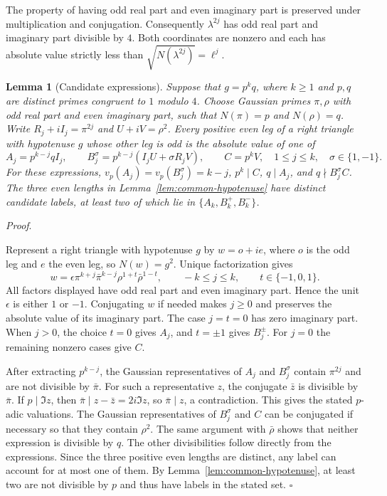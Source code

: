 \documentclass[11pt,a4paper,twoside]{article}
\numberwithin{equation}{section}
\newcommand{\proseheadingstop}{.}
\newtheorem{lemma}[theorem]{Lemma}
\providecommand{\proofname}{Proof}
\newenvironment{proof}[1][\proofname]{%
  \par\addvspace{.65\baselineskip}\noindent
  \textit{#1}\proseheadingstop\enspace\ignorespaces
}{%
  \unskip\nobreak\hfill\nobreak\(\square\)\par
  \addvspace{.65\baselineskip}
}
\begin{document}
The property of having odd real part and even imaginary part is preserved under multiplication and conjugation. Consequently \(\lambda^{2j}\) has odd real part and imaginary part divisible by \(4\). Both coordinates are nonzero and each has absolute value strictly less than \(\sqrt{N(\lambda^{2j})}=\ell^j\).

\begin{lemma}[Candidate expressions]
\label{lem:candidates}
Suppose that \(g=p^kq\), where \(k\ge1\) and \(p,q\) are distinct primes congruent to \(1\) modulo \(4\). Choose Gaussian primes \(\pi,\rho\) with odd real part and even imaginary part, such that \(N(\pi)=p\) and \(N(\rho)=q\). Write \(R_j+iI_j=\pi^{2j}\) and \(U+iV=\rho^2\). Every positive even leg of a right triangle with hypotenuse \(g\) whose other leg is odd is the absolute value of one of
\[
A_j=p^{k-j}qI_j,\qquad B_j^\sigma=p^{k-j}(I_jU+\sigma R_jV),\qquad
C=p^kV,
\quad 1\le j\le k,\quad \sigma\in\{1,-1\}.
\]
For these expressions, \(v_p(A_j)=v_p(B_j^\sigma)=k-j\), \(p^k\mid C\), \(q\mid A_j\), and \(q\nmid B_j^\sigma C\). The three even lengths in Lemma~\ref{lem:common-hypotenuse} have distinct candidate labels, at least two of which lie in \(\{A_k,B_k^+,B_k^-\}\).
\end{lemma}

\begin{proof}
Represent a right triangle with hypotenuse \(g\) by \(w=o+ie\), where \(o\) is the odd leg and \(e\) the even leg, so \(N(w)=g^2\). Unique factorization gives
\[
w=\epsilon\pi^{k+j}\bar\pi^{k-j}\rho^{1+t}\bar\rho^{1-t},
\qquad -k\le j\le k,\qquad t\in\{-1,0,1\}.
\]
All factors displayed have odd real part and even imaginary part. Hence the unit \(\epsilon\) is either \(1\) or \(-1\). Conjugating \(w\) if needed makes \(j\ge0\) and preserves the absolute value of its imaginary part. The case \(j=t=0\) has zero imaginary part. When \(j>0\), the choice \(t=0\) gives \(A_j\), and \(t=\pm1\) gives \(B_j^\pm\). For \(j=0\) the remaining nonzero cases give \(C\).

After extracting \(p^{k-j}\), the Gaussian representatives of \(A_j\) and \(B_j^\sigma\) contain \(\pi^{2j}\) and are not divisible by \(\bar\pi\). For such a representative \(z\), the conjugate \(\bar z\) is divisible by \(\bar\pi\). If \(p\mid\Im z\), then \(\bar\pi\mid z-\bar z=2i\Im z\), so \(\bar\pi\mid z\), a contradiction. This gives the stated \(p\)-adic valuations. The Gaussian representatives of \(B_j^\sigma\) and \(C\) can be conjugated if necessary so that they contain \(\rho^2\). The same argument with \(\bar\rho\) shows that neither expression is divisible by \(q\). The other divisibilities follow directly from the expressions. Since the three positive even lengths are distinct, any label can account for at most one of them. By Lemma~\ref{lem:common-hypotenuse}, at least two are not divisible by \(p\) and thus have labels in the stated set.
\end{proof}
\end{document}
